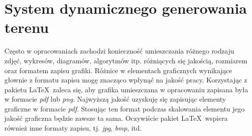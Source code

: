 \section{System dynamicznego generowania terenu}

Często w opracowaniach zachodzi konieczność umieszczania różnego rodzaju zdjęć, wykresów, diagramów, algorytmów itp. różniących się jakością, rozmiarem oraz formatem zapisu grafiki. Różnice w elementach graficznych wynikające głownie z formatu zapisu mogę znacząco wpłynąć na jakość pracy. Korzystając z pakietu \LaTeX\ zaleca się, aby grafika umieszczana w opracowaniu zapisana była w formacie \textit{pdf} lub \textit{png}. Najwyższą jakość uzyskuję się zapisując elementy graficzne w formacie \textit{pdf}. Stosując ten format podczas skalowania elementu jego jakość graficzna będzie zawsze ta sama. Oczywiście pakiet \LaTeX\ wspiera również inne formaty zapisu, tj. \textit{jpg}, \textit{bmp}, itd.